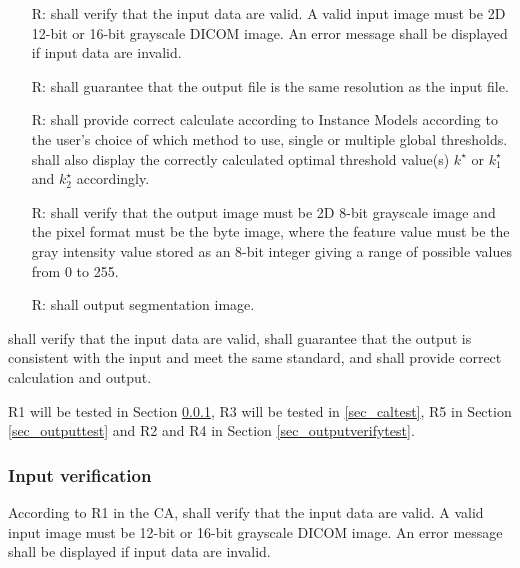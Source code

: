 \documentclass[12pt, titlepage]{article}
\begin{document}
\begin{itemize}

\item[R\refstepcounter{reqnum}\thereqnum \label{R_Inputs}:] \famname{} shall
verify that the input data are valid. A valid input image must be 2D 12-bit or
16-bit grayscale DICOM image. An error message shall be displayed if input data
are invalid.

\item[R\refstepcounter{reqnum}\thereqnum \label{R_OutputInputs}:] \famname{}
shall guarantee that the output file is the same resolution as the input file.

\item[R\refstepcounter{reqnum}\thereqnum \label{R_Calculate}:] \famname{} shall
provide correct calculate according to Instance Models according to the user's
choice of which method to use, single or multiple global thresholds. \famname{}
shall also display the correctly calculated optimal threshold value(s)
$k^{\star}$ or $k^{\star}_{1}$ and $k^{\star}_{2}$ accordingly.

\item[R\refstepcounter{reqnum}\thereqnum \label{R_VerifyOutput}:] \famname{}
  shall verify that the output image must be 2D 8-bit grayscale image and the
  pixel format must be the byte image, where the feature value must be the gray
  intensity value stored as an 8-bit integer giving a range of possible values
  from 0 to 255.

\item[R\refstepcounter{reqnum}\thereqnum \label{R_Outputk}:] 
\famname{} shall output segmentation image.

\end{itemize}

\progname{} shall verify that the input data are valid, shall guarantee that the
output is consistent with the input and meet the same standard, and shall
provide correct calculation and output.

R1 will be tested in Section \ref{sec_inputtest}, R3 will be tested in
\ref{sec_caltest}, R5 in Section \ref{sec_outputtest} and R2 and R4 in Section
\ref{sec_outputverifytest}.

\subsubsection{Input verification}
\label{sec_inputtest}

According to R1 in the CA, \progname{} shall verify that the input data are
valid. A valid input image must be 12-bit or 16-bit grayscale DICOM image. An
error message shall be displayed if input data are invalid.
\end{document}
